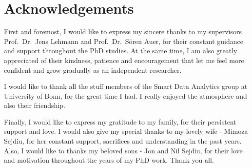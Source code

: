 \chapter*{Acknowledgements}
\label{sec:ack}
First and foremost, I would like to express my sincere thanks to my supervisors Prof.\ Dr.\ Jens Lehmann and Prof.\ Dr.\ S{\"o}ren Auer, for their constant guidance and support throughout the PhD studies.
At the same time, I am also greatly appreciated of their kindness, patience and encouragement that let me feel more confident and grow gradually as an independent researcher.

I would like to thank all the stuff members of the Smart Data Analytics group at University of Bonn, for the great time I had.
I really enjoyed the atmosphere and also their friendship.

Finally, I would like to express my gratitude to my family, for their persistent support and love.
I would also give my special thanks to my lovely wife - Mimoza Sejdiu, for her constant support, sacrifices and understanding in the past years.
Also, I would like to thanks my beloved sons - Jon and Nil Sejdiu, for their love and motivation throughout the years of my PhD work.
Thank you all.

